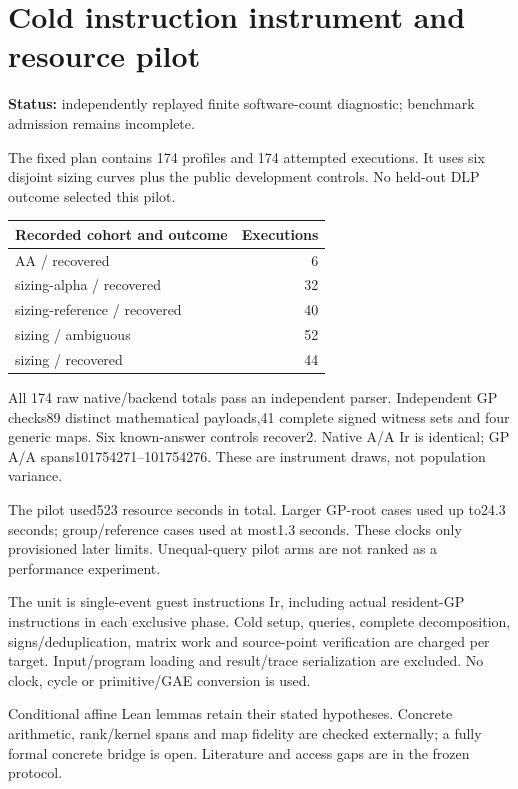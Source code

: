 \documentclass[
  10pt,
]{article}
\author{}
\date{}
\begin{document}
\section{Cold instruction instrument and resource
pilot}\label{cold-instruction-instrument-and-resource-pilot}

\textbf{Status:} independently replayed finite software-count
diagnostic; benchmark admission remains incomplete.

The fixed plan contains 174 profiles and 174 attempted executions. It
uses six disjoint sizing curves plus the public development controls. No
held-out DLP outcome selected this pilot.

\begin{longtable}[]{@{}lr@{}}
\toprule\noalign{}
Recorded cohort and outcome & Executions \\
\midrule\noalign{}
\endhead
\bottomrule\noalign{}
\endlastfoot
AA / recovered & 6 \\
sizing-alpha / recovered & 32 \\
sizing-reference / recovered & 40 \\
sizing / ambiguous & 52 \\
sizing / recovered & 44 \\
\end{longtable}

All 174 raw native/backend totals pass an independent parser.
Independent GP checks89 distinct mathematical payloads,41 complete
signed witness sets and four generic maps. Six known-answer controls
recover2. Native A/A Ir is identical; GP A/A spans101754271--101754276.
These are instrument draws, not population variance.

The pilot used523 resource seconds in total. Larger GP-root cases used
up to24.3 seconds; group/reference cases used at most1.3 seconds. These
clocks only provisioned later limits. Unequal-query pilot arms are not
ranked as a performance experiment.

The unit is single-event guest instructions Ir, including actual
resident-GP instructions in each exclusive phase. Cold setup, queries,
complete decomposition, signs/deduplication, matrix work and
source-point verification are charged per target. Input/program loading
and result/trace serialization are excluded. No clock, cycle or
primitive/GAE conversion is used.

Conditional affine Lean lemmas retain their stated hypotheses. Concrete
arithmetic, rank/kernel spans and map fidelity are checked externally; a
fully formal concrete bridge is open. Literature and access gaps are in
the frozen protocol.
\end{document}
